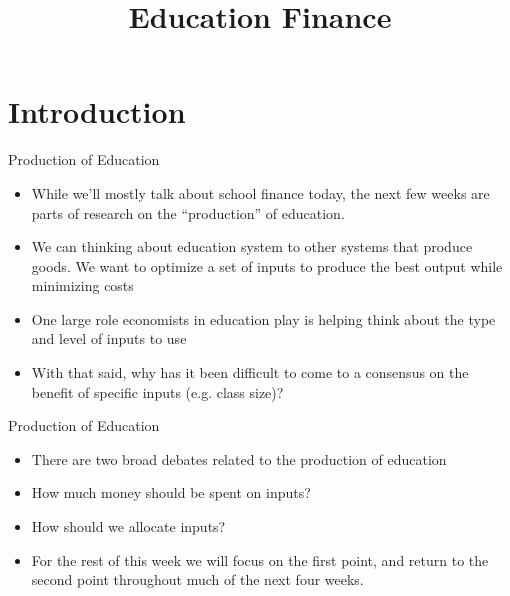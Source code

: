 \documentclass[handout]{beamer}
\title{Education Finance}
\begin{document}
\maketitle

\section{Introduction}

\begin{frame}[<+->]{Production of Education}
	\begin{itemize}
		\item While we'll mostly talk about school finance today, the next few weeks are parts of research on the ``production'' of education. 
		\item We can thinking about education system to other systems that produce goods. We want to optimize a set of inputs to produce the best output while minimizing costs 
		\item One large role economists in education play is helping think about the type and level of inputs to use 
		\item With that said, why has it been difficult to come to a consensus on the benefit of specific inputs (e.g. class size)?
	\end{itemize}
\end{frame}

\begin{frame}[<+->]{Production of Education}
	\begin{itemize}
		\item There are two broad debates related to the production of education
		\item How much money should be spent on inputs?
		\item How should we allocate inputs?
		\item For the rest of this week we will focus on the first point, and return to the second point throughout much of the next four weeks.
	\end{itemize}
\end{frame}
\end{document}
